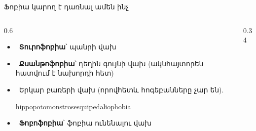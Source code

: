 \begin{frame}{Ֆոբիա կարող է դառնալ ամեն ինչ}
  \begin{columns}[c]
    \begin{column}{0.6\textwidth}
      \begin{itemize}
        \item {}\ \textbf{Տուրոֆոբիա}՝ պանրի վախ
        \item<2-> \ \textbf{Քսանթոֆոբիա}՝ դեղին գույնի վախ (ակնհայտորեն հատվում է նախորդի հետ)
        \item<3-> \ Երկար բառերի վախ (որովհետև հոգեբանները չար են).\par
          {\blackfont\small hippopotomonstrosesquipedaliophobia}
        \item<4-> \ \textbf{Ֆոբոֆոբիա}՝ ֆոբիա ունենալու վախ
      \end{itemize}
    \end{column}
    \begin{column}{0.34\textwidth}
    \end{column}
  \end{columns}
\end{frame}

